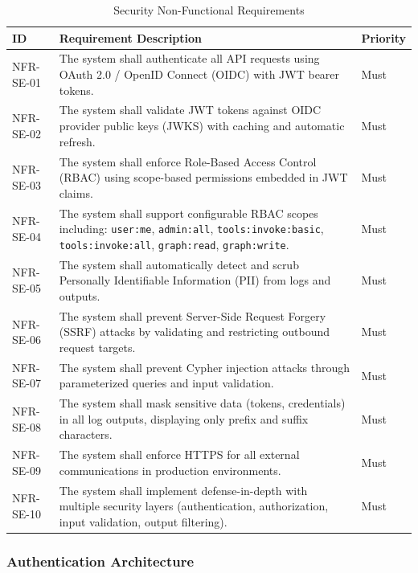 \documentclass[a4paper,twoside]{sapthesis}
\begin{document}
\begin{table}[htbp]
\centering
\caption{Security Non-Functional Requirements}
\label{tab:nfr-security}
\small
\begin{tabularx}{\textwidth}{|l|X|l|}
\hline
\textbf{ID} & \textbf{Requirement Description} & \textbf{Priority} \\
\midrule
NFR-SE-01 & The system shall authenticate all API requests using OAuth 2.0 / OpenID Connect (OIDC) with JWT bearer tokens. & Must \\
\midrule
NFR-SE-02 & The system shall validate JWT tokens against OIDC provider public keys (JWKS) with caching and automatic refresh. & Must \\
\midrule
NFR-SE-03 & The system shall enforce Role-Based Access Control (RBAC) using scope-based permissions embedded in JWT claims. & Must \\
\midrule
NFR-SE-04 & The system shall support configurable RBAC scopes including: \texttt{user:me}, \texttt{admin:all}, \texttt{tools:invoke:basic}, \texttt{tools:invoke:all}, \texttt{graph:read}, \texttt{graph:write}. & Must \\
\midrule
NFR-SE-05 & The system shall automatically detect and scrub Personally Identifiable Information (PII) from logs and outputs. & Must \\
\midrule
NFR-SE-06 & The system shall prevent Server-Side Request Forgery (SSRF) attacks by validating and restricting outbound request targets. & Must \\
\midrule
NFR-SE-07 & The system shall prevent Cypher injection attacks through parameterized queries and input validation. & Must \\
\midrule
NFR-SE-08 & The system shall mask sensitive data (tokens, credentials) in all log outputs, displaying only prefix and suffix characters. & Must \\
\midrule
NFR-SE-09 & The system shall enforce HTTPS for all external communications in production environments. & Must \\
\midrule
NFR-SE-10 & The system shall implement defense-in-depth with multiple security layers (authentication, authorization, input validation, output filtering). & Must \\
\midrule
\end{tabularx}
\end{table}

\subsubsection{Authentication Architecture}
\end{document}
